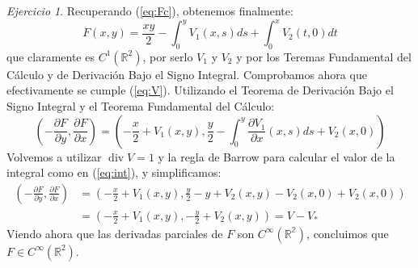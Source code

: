 \documentclass[12pt,spanish]{article}
\theoremstyle{definition}
\theoremstyle{remark}
\newtheorem{exercise}{Ejercicio}
\begin{document}
\begin{exercise}
Recuperando (\ref{eq:Fc}), obtenemos finalmente:
\begin{equation}
  \label{eq:F}
  F(x,y)=\frac{xy}{2}-\int_0^y V_1(x,s)ds+\int_0^x V_2(t,0)dt
\end{equation}
que claramente es $C^1(\mathbb{R}^2)$, por serlo $V_1$ y $V_2$ y por
los Teremas Fundamental del Cálculo y de Derivación Bajo el Signo
Integral. Comprobamos ahora que efectivamente se cumple
(\ref{eq:V}). Utilizando el Teorema de Derivación Bajo el Signo
Integral y el Teorema Fundamental del Cálculo:
\begin{equation*}
  \left(-\frac{\partial F}{\partial y},\frac{\partial F}{\partial x}\right)=\left(-\frac{x}{2}+V_1(x,y),\frac{y}{2}-\int_0^y \frac{\partial V_1}{\partial x}(x,s)ds+V_2(x,0)\right)
\end{equation*}
Volvemos a utilizar $\operatorname{div}V=1$ y la regla de Barrow para
calcular el valor de la integral como en (\ref{eq:int}), y
simplificamos:
\begin{align*}
  \left(-\frac{\partial F}{\partial y},\frac{\partial F}{\partial x}\right)&=\left(-\frac{x}{2}+V_1(x,y),\frac{y}{2}-y+V_2(x,y)-V_2(x,0)+V_2(x,0)\right) \\
  &=\left(-\frac{x}{2}+V_1(x,y),-\frac{y}{2}+V_2(x,y)\right)=V-V_*
\end{align*}
Viendo ahora que las derivadas parciales de $F$ son
$C^\infty(\mathbb{R^2})$, concluimos que $F\in C^\infty(\mathbb{R}^2)$.
\end{exercise}
\end{document}
